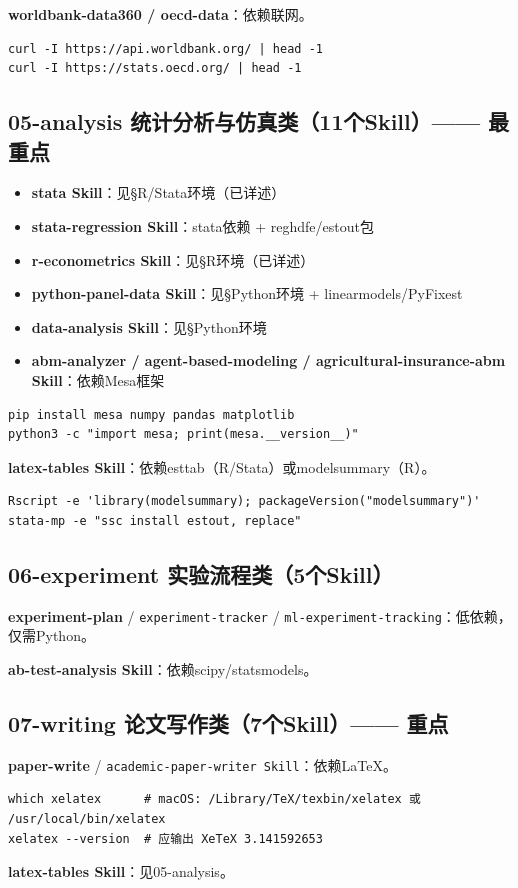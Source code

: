 \textbf{worldbank-data360 / oecd-data}：依赖联网。
\begin{lstlisting}[style=shell]
curl -I https://api.worldbank.org/ | head -1
curl -I https://stats.oecd.org/ | head -1
\end{lstlisting}

\subsection{05-analysis 统计分析与仿真类（11个Skill）—— 最重点}
\begin{itemize}[leftmargin=1em]
  \item \textbf{stata Skill}：见§R/Stata环境（已详述）
  \item \textbf{stata-regression Skill}：stata依赖 + reghdfe/estout包
  \item \textbf{r-econometrics Skill}：见§R环境（已详述）
  \item \textbf{python-panel-data Skill}：见§Python环境 + linearmodels/PyFixest
  \item \textbf{data-analysis Skill}：见§Python环境
  \item \textbf{abm-analyzer / agent-based-modeling / agricultural-insurance-abm Skill}：依赖Mesa框架
\end{itemize}
\begin{lstlisting}[style=shell]
pip install mesa numpy pandas matplotlib
python3 -c "import mesa; print(mesa.__version__)"
\end{lstlisting}
\textbf{latex-tables Skill}：依赖esttab（R/Stata）或modelsummary（R）。
\begin{lstlisting}[style=shell]
Rscript -e 'library(modelsummary); packageVersion("modelsummary")'
stata-mp -e "ssc install estout, replace"
\end{lstlisting}

\subsection{06-experiment 实验流程类（5个Skill）}
\textbf{experiment-plan} / \texttt{experiment-tracker} / \texttt{ml-experiment-tracking}：低依赖，仅需Python。

\textbf{ab-test-analysis Skill}：依赖scipy/statsmodels。

\subsection{07-writing 论文写作类（7个Skill）—— 重点}
\textbf{paper-write} / \texttt{academic-paper-writer Skill}：依赖LaTeX。
\begin{lstlisting}[style=shell]
which xelatex      # macOS: /Library/TeX/texbin/xelatex 或 /usr/local/bin/xelatex
xelatex --version  # 应输出 XeTeX 3.141592653
\end{lstlisting}
\textbf{latex-tables Skill}：见05-analysis。

